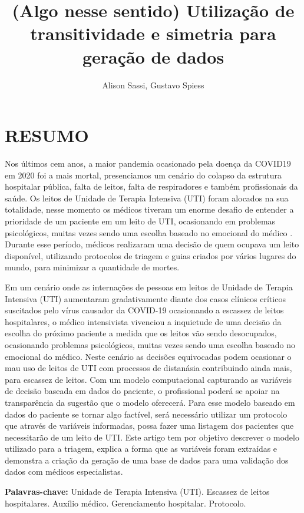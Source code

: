 \documentclass[12pt]{article}
\title{(Algo nesse sentido) Utilização de transitividade e simetria para geração de dados}
\author{Alison Sassi\inst{1}, Gustavo Spiess\inst{2} }
\begin{document}
 

\maketitle

\section{RESUMO}

Nos últimos cem anos, a maior pandemia ocasionado pela doença da COVID19 em 2020 foi a mais mortal, presenciamos um cenário do colapso da estrutura hospitalar pública, falta de leitos, falta de respiradores e também profissionais da saúde. Os leitos de Unidade de Terapia Intensiva (UTI) foram alocados na sua totalidade, nesse momento os médicos tiveram um enorme desafio de entender a prioridade de um paciente em um leito de UTI, ocasionando em problemas psicológicos, muitas vezes sendo uma escolha baseado no emocional do médico . Durante esse período, médicos realizaram uma decisão de quem ocupava um leito disponível, utilizando protocolos de triagem e guias criados por vários lugares do mundo, para minimizar a quantidade de mortes.

Em um cenário onde as internações de pessoas em leitos de Unidade de Terapia Intensiva (UTI) aumentaram gradativamente diante dos casos clínicos críticos suscitados pelo vírus causador da COVID-19 ocasionando a escassez de leitos hospitalares, o médico intensivista vivenciou a inquietude de uma decisão da escolha do próximo paciente a medida que os leitos vão sendo desocupados, ocasionando problemas psicológicos, muitas vezes sendo uma escolha baseado no emocional do médico. Neste cenário as decisões equivocadas podem ocasionar o mau uso de leitos de UTI com processos de distanásia contribuindo  ainda mais, para escassez de leitos. Com um modelo computacional capturando as variáveis de decisão baseada em dados do paciente, o profissional poderá se apoiar na transparência da sugestão que o modelo oferecerá. Para esse modelo baseado em dados do paciente se tornar algo factível, será necessário utilizar um protocolo que através de variáveis informadas, possa fazer uma listagem dos pacientes que necessitarão de um leito de UTI. Este artigo tem por objetivo descrever o modelo utilizado para a triagem, explica a forma que as variáveis foram extraídas e demonstra a criação da geração de uma base de dados para uma validação dos dados com médicos especialistas.

\textbf{Palavras-chave:} Unidade de Terapia Intensiva (UTI). Escassez de leitos hospitalares. Auxílio médico. Gerenciamento hospitalar. Protocolo.
\end{document}
